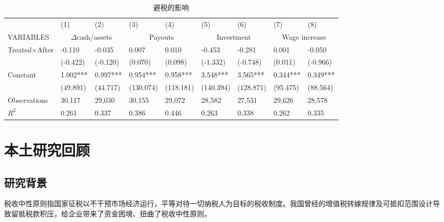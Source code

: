\documentclass{article}
\begin{document}
\begin{table}[H]
    \centering
    \caption{避税的影响}
    \small
    \begin{tabularx}{\textwidth}{lXXXXXXXX}
    \toprule
                  & (1)             & (2)            & (3)          & (4)          & (5)            & (6)           & (7)             & (8)             \\ \cmidrule(l){2-3} \cmidrule(l){4-5} \cmidrule(l){6-7} \cmidrule(l){8-9} 
    VARIABLES     & \multicolumn{2}{c}{$\Delta$cash/assets} & \multicolumn{2}{c}{Payouts} & \multicolumn{2}{c}{Investment} & \multicolumn{2}{c}{Wage increase} \\ \midrule
    Treated×After & -0.110          & -0.035         & 0.007        & 0.010        & -0.453         & -0.281        & 0.001           & -0.050          \\
                  & (-0.422)        & (-0.120)       & (0.070)      & (0.098)      & (-1.332)       & (-0.748)      & (0.011)         & (-0.966)        \\
    Constant      & 1.002***        & 0.997***       & 0.954***     & 0.958***     & 3.548***       & 3.565***      & 0.344***        & 0.349***        \\
                  & (49.891)        & (44.717)       & (130.074)    & (118.181)    & (140.394)      & (128.871)     & (95.475)        & (88.564)        \\
    Observations  & 30,117          & 29,030         & 30,155       & 29,072       & 28,582         & 27,531        & 29,626          & 28,578          \\
    $R^2$     & 0.261           & 0.337          & 0.386        & 0.446        & 0.263          & 0.338         & 0.262           & 0.335           \\ \bottomrule
    \end{tabularx}
\end{table}

\section{本土研究回顾}
\subsection{研究背景}
\indent 税收中性原则指国家征税以不干预市场经济运行，平等对待一切纳税人为目标的税收制度。我国曾经的增值税转嫁规律及可抵扣范围设计导致留抵税款积压，给企业带来了资金困境、扭曲了税收中性原则。
\end{document}
